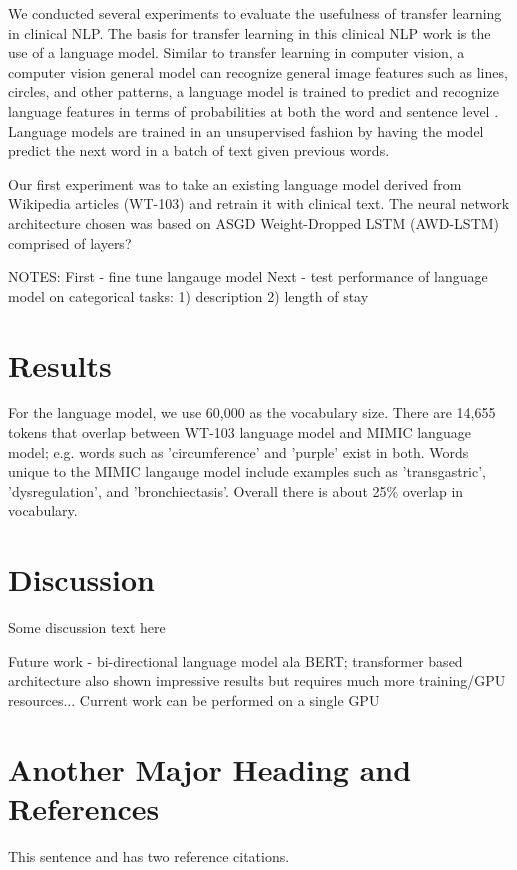 \documentclass{amia}
\begin{document}
We conducted several experiments to evaluate the usefulness of transfer learning in clinical NLP. The basis for transfer learning in this clinical NLP work is the use of a language model. Similar to transfer learning in computer vision, a computer vision general model can recognize general image features such as lines, circles, and other patterns, a language model is trained to predict and recognize language features in terms of probabilities at both the word and sentence level \cite{Bengio:2003:NPL:944919.944966}. Language models are trained in an unsupervised fashion by having the model predict the next word in a batch of text given previous words.

Our first experiment was to take an existing language model derived from Wikipedia articles (WT-103) \cite{Merity2016Sep} and retrain it with clinical text. The neural network architecture chosen was based on ASGD Weight-Dropped LSTM (AWD-LSTM) \cite{Merity2017Aug} comprised of layers? 

NOTES:
First - fine tune langauge model
Next - test performance of language model on categorical tasks: 1) description 2) length of stay

\section*{Results}

For the language model, we use 60,000 as the vocabulary size. There are 14,655 tokens that overlap between WT-103 language model and MIMIC language model; e.g. words such as 'circumference' and 'purple' exist in both. Words unique to the MIMIC langauge model include examples such as 'transgastric', 'dysregulation', and 'bronchiectasis'. Overall there is about 25\% overlap in vocabulary.

\section*{Discussion}

Some discussion text here

Future work - bi-directional language model ala BERT; transformer based architecture also shown impressive results but requires much more training/GPU resources...
Current work can be performed on a single GPU

\section*{Another Major Heading and References}
This sentence and has two reference citations\cite{ref1,ref2}.
\end{document}
